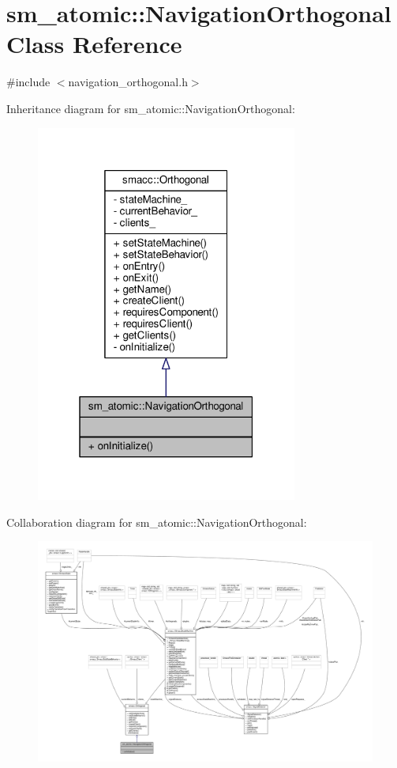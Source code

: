 \hypertarget{classsm__atomic_1_1NavigationOrthogonal}{}\section{sm\+\_\+atomic\+:\+:Navigation\+Orthogonal Class Reference}
\label{classsm__atomic_1_1NavigationOrthogonal}


{\ttfamily \#include $<$navigation\+\_\+orthogonal.\+h$>$}



Inheritance diagram for sm\+\_\+atomic\+:\+:Navigation\+Orthogonal\+:
\nopagebreak
\begin{figure}[H]
\begin{center}
\leavevmode
\includegraphics[width=244pt]{classsm__atomic_1_1NavigationOrthogonal__inherit__graph}
\end{center}
\end{figure}


Collaboration diagram for sm\+\_\+atomic\+:\+:Navigation\+Orthogonal\+:
\nopagebreak
\begin{figure}[H]
\begin{center}
\leavevmode
\includegraphics[width=350pt]{classsm__atomic_1_1NavigationOrthogonal__coll__graph}
\end{center}
\end{figure}
